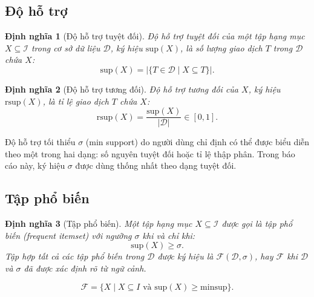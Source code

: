 \documentclass[12pt,a4paper]{report}
\newtheorem{definition}{Định nghĩa}[chapter]
\begin{document}
\subsection{Độ hỗ trợ}
 
\begin{definition}[Độ hỗ trợ tuyệt đối]
Độ hỗ trợ tuyệt đối của một tập hạng mục $X \subseteq \mathcal{I}$ trong cơ sở dữ
liệu $\mathcal{D}$, ký hiệu $\mathrm{sup}(X)$, là số lượng giao dịch $T$ trong $\mathcal{D}$
chứa $X$:
\begin{equation}
    \mathrm{sup}(X) = \bigl|\{T \in \mathcal{D} \mid X \subseteq T\}\bigr|.
    \label{eq:support}
\end{equation}
\end{definition}
 
\begin{definition}[Độ hỗ trợ tương đối]
Độ hỗ trợ tương đối của $X$, ký hiệu $\mathrm{rsup}(X)$, là tỉ lệ giao dịch $T$ chứa $X$:
\begin{equation}
    \mathrm{rsup}(X) = \frac{\mathrm{sup}(X)}{|\mathcal{D}|} \in [0, 1].
    \label{eq:relsupport}
\end{equation}
\end{definition}
 
Độ hỗ trợ tối thiểu $\sigma$ (min support) do người dùng chỉ định
có thể được biểu diễn theo một trong hai dạng: số nguyên tuyệt đối hoặc tỉ lệ thập
phân. Trong báo cáo này, ký hiệu $\sigma$ được dùng thống nhất theo dạng tuyệt đối.
 
\subsection{Tập phổ biến}
 
\begin{definition}[Tập phổ biến]
Một tập hạng mục $X \subseteq \mathcal{I}$ được gọi là \textit{tập phổ biến}
(frequent itemset) với ngưỡng $\sigma$ khi và chỉ khi:
\begin{equation}
    \mathrm{sup}(X) \geq \sigma.
    \label{eq:frequent}
\end{equation}
Tập hợp tất cả các tập phổ biến trong $\mathcal{D}$ được ký hiệu là
$\mathcal{F}(\mathcal{D}, \sigma)$, hay $\mathcal{F}$ khi $\mathcal{D}$ và $\sigma$
đã được xác định rõ từ ngữ cảnh.

\begin{equation}
    \mathcal{F} = \{X \mid X \subseteq I \text{ và } \mathrm{sup}(X) \geq \mathrm{minsup}\}.
    \label{eq:fequent_itemsets}
\end{equation}
\end{definition}
\end{document}
